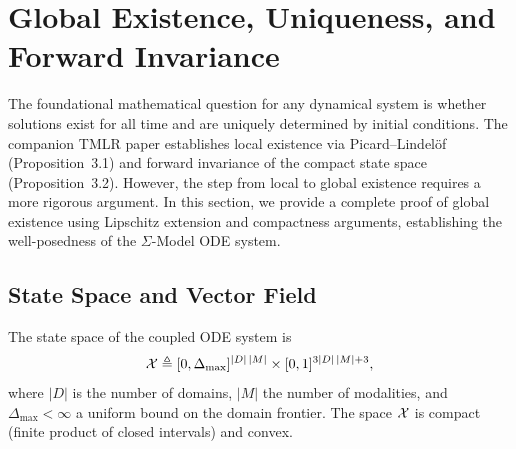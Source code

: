 
\section{Global Existence, Uniqueness, and Forward Invariance}
\label{sec:global-existence}

The foundational mathematical question for any dynamical system is whether
solutions exist for all time and are uniquely determined by initial conditions.
The companion TMLR paper establishes local existence via Picard--Lindel\"of
(Proposition~3.1) and forward invariance of the compact state space
(Proposition~3.2). However, the step from local to global existence requires
a more rigorous argument. In this section, we provide a complete proof of
global existence using Lipschitz extension and compactness arguments,
establishing the well-posedness of the $\Sigma$-Model ODE system.

\subsection{State Space and Vector Field}

\begin{definition}
\label{def:state-space}
The state space of the coupled ODE system is
\[
\mathcal{X} \triangleq [0, \Delta_{\max}]^{|D|\,|M|} \times [0,1]^{3|D|\,|M| + 3},
\]
where $|D|$ is the number of domains, $|M|$ the number of modalities, and
$\Delta_{\max} < \infty$ a uniform bound on the domain frontier.
The space $\mathcal{X}$ is compact (finite product of closed intervals) and convex.
\end{definition}

